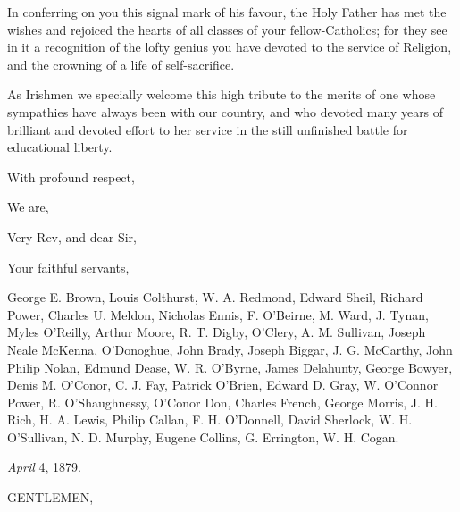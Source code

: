 In conferring on you this signal mark of his favour, the Holy
Father has met the wishes and rejoiced the hearts of all classes of
your fellow-Catholics; for they see in it a recognition of the lofty
genius you have devoted to the service of Religion, and the
crowning of a life of self-sacrifice.

As Irishmen we specially welcome this high tribute to the merits of
one whose sympathies have always been with our country, and who
devoted many years of brilliant and devoted effort to her service in
the still unfinished battle for educational liberty.

With profound respect,

We are,

Very Rev, and dear Sir,

Your faithful servants,

George E. Brown, Louis Colthurst, W. A. Redmond, Edward
Sheil, Richard Power, Charles U. Meldon, Nicholas Ennis, F. O'Beirne,
M. Ward, J. Tynan, Myles O'Reilly, Arthur Moore, R. T. Digby, O'Clery,
A. M. Sullivan, Joseph Neale McKenna, O'Donoghue, John Brady, Joseph
Biggar, J. G. McCarthy, John Philip Nolan, Edmund Dease, W. R. O'Byrne,
James Delahunty, George Bowyer, Denis M. O'Conor, C. J. Fay, Patrick O'Brien,
Edward D. Gray, W. O'Connor Power, R. O'Shaughnessy, O'Conor Don,
Charles French, George Morris, J. H. Rich, H. A. Lewis, Philip Callan,
F. H. O'Donnell, David Sherlock, W. H. O'Sullivan, N. D. Murphy,
Eugene Collins, G. Errington, W. H. Cogan.


\emph{April} 4, 1879.

GENTLEMEN,

